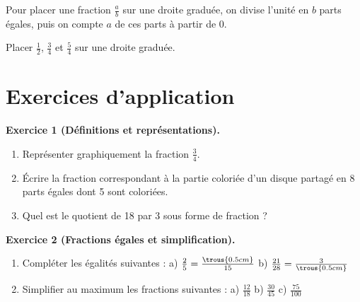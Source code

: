 \begin{methodebox}
  Pour placer une fraction $\frac{a}{b}$ sur une droite graduée, on divise l'unité en $b$ parts égales, puis on compte $a$ de ces parts à partir de 0.
\end{methodebox}

\begin{examplebox}
  Placer $\frac{1}{2}$, $\frac{3}{4}$ et $\frac{5}{4}$ sur une droite graduée.
  \begin{center}
  \end{center}
\end{examplebox}

\section{Exercices d'application}

\begin{exercisebox}
\textbf{Exercice 1 (Définitions et représentations).}
\begin{enumerate}
  \item Représenter graphiquement la fraction $\frac{3}{4}$.
  \item Écrire la fraction correspondant à la partie coloriée d'un disque partagé en 8 parts égales dont 5 sont coloriées.
  \item Quel est le quotient de 18 par 3 sous forme de fraction ?
\end{enumerate}
\end{exercisebox}

\begin{exercisebox}
\textbf{Exercice 2 (Fractions égales et simplification).}
\begin{enumerate}
  \item Compléter les égalités suivantes :
    a) $\frac{2}{5} = \frac{\trous{0.5cm}}{15}$
    b) $\frac{21}{28} = \frac{3}{\trous{0.5cm}}$
  \item Simplifier au maximum les fractions suivantes :
    a) $\frac{12}{18}$
    b) $\frac{30}{45}$
    c) $\frac{75}{100}$
\end{enumerate}
\end{exercisebox}

